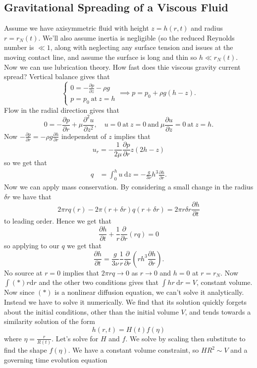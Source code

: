 \documentclass{article}
\begin{document}
\subsection{Gravitational Spreading of a Viscous Fluid}
Assume we have axisymmetric fluid with height $ z = h(r,t) $ and radius $ r = r_N(t) $. We'll also assume inertia is negligible (so the reduced Reynolds number is $ \ll 1 $, along with neglecting any surface tension and issues at the moving contact line, and assume the surface is long and thin so $ h \ll r_N(t) $. Now we can use lubrication theory. How fast does thie viscous gravity current spread? Vertical balance gives that 
\[
  \begin{cases}
     0 = -\frac{\partial p}{\partial z} - \rho g \\
     p = p_0 \ \text{at}\ z = h
  \end{cases} \implies p = p_0 + \rho g(h-z).
\]
Flow in the radial direction gives that 
\[
   0 = -\frac{\partial p}{\partial r} + \mu \frac{\partial^2 u}{\partial z^2}, \quad u = 0\ \text{at}\ z= 0\ \text{and}\ \mu\frac{\partial u}{\partial z} = 0\ \text{at}\ z=h.
\]
Now $ -\frac{\partial p}{\partial r} = - \rho g \frac{\partial h}{\partial r} $ independent of $ z $ implies that 
\[
	u_r = -\frac 1{2\mu} \frac{\partial p}{\partial r} z( 2h- z)
\]
so we get that
\begin{align*}
	q &= \int_0^h u \ \mathrm dz = -\frac{g}{3\nu} h^3 \frac{\partial h}{\partial r}.
\end{align*}
Now we can apply mass conservation. By considering a small change in the radius $ \delta r $ we have that
\[
	2\pi r q(r) - 2\pi (r+\delta r) q(r+\delta r) = 2\pi r\delta r \frac{\partial h}{\partial t}
\]
to leading order. Hence we get that
\[
	\frac{\partial h}{\partial t} + \frac 1r \frac{\partial}{\partial r} (rq) = 0 \tag{*}
\]
so applying to our $ q $ we get that 
\[
   \frac{\partial h}{\partial t} = \frac {g}{3\nu} \frac 1r\frac{\partial }{\partial r} \left(r h^3 \frac{\partial h}{\partial r}\right).
\]
No source at $ r=0 $ implies that $ 2\pi r q\to 0 $ as $ r\to 0 $ and $ h = 0 $ at $ r = r_N $. Now $ \int (*) r \mathrm dr $ and the other two conditions gives that $ \int hr \ \mathrm dr = V $, constant volume. Now since $ (*) $ is a nonlinear diffusion equation, we can't solve it analytically. Instead we have to solve it numerically. We find that its solution quickly forgets about the initial conditions, other than the initial volume $ V $, and tends towards a similarity solution of the form
\[
  h(r,t) = H(t)f(\eta)
\]
where $ \eta = \frac r{R(t)} $. Let's solve for $ H $ and $ f $. We solve by scaling  then substitute to find the shape $ f(\eta) $. We have a constant volume constraint, so $ HR^2 \sim V $ and a governing time evolution equation 
\end{document}
